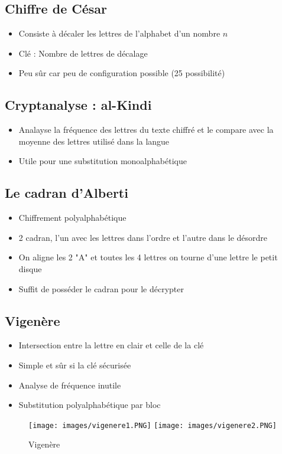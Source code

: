 \documentclass[a4paper]{article}
\begin{document}
\subsection{Chiffre de César}
\begin{itemize}[label=\textbullet, font=\Large]
    \item Consiste à décaler les lettres de l'alphabet d'un nombre $n$
    \item Clé : Nombre de lettres de décalage
    \item Peu sûr car peu de configuration possible (25 possibilité)
\end{itemize}

\subsection{Cryptanalyse : al-Kindi}
\begin{itemize}[label=\textbullet, font=\Large]
    \item Analayse la fréquence des lettres du texte chiffré et le compare avec la moyenne des lettres utilisé dans la langue
    \item Utile pour une substitution monoalphabétique
\end{itemize}

\subsection{Le cadran d'Alberti}
\begin{itemize}[label=\textbullet, font=\Large]
    \item Chiffrement polyalphabétique
    \item 2 cadran, l'un avec les lettres dans l'ordre et l'autre dans le désordre
    \item On aligne les 2 "A" et toutes les 4 lettres on tourne d'une lettre le petit disque
    \item Suffit de posséder le cadran pour le décrypter
\end{itemize}

\subsection{Vigenère}
\begin{itemize}[label=\textbullet, font=\Large]
    \item Intersection entre la lettre en clair et celle de la clé
    \item Simple et sûr si la clé sécurisée
    \item Analyse de fréquence inutile
    \item Substitution polyalphabétique par bloc
\end{itemize}
\begin{figure}[H]
    \centering
    \texttt{[image: images/vigenere1.PNG]}
    \texttt{[image: images/vigenere2.PNG]}
    \caption{Vigenère}
\end{figure}
\end{document}
